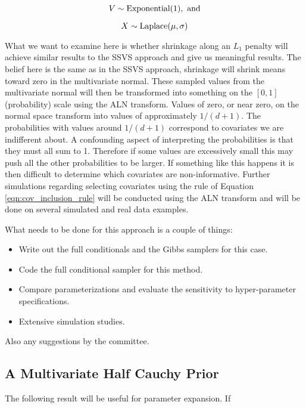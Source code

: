 \begin{equation}\newnot{symbol:exponential_dist}
V \sim \text{Exponential}(1), \text{ and}
\end{equation}

\begin{equation}\newnot{symbol:laplace_dist}
X \sim \text{Laplace}(\mu, \sigma)
\end{equation}

What we want to examine here is whether shrinkage along an $L_1$ penalty will achieve similar results to the SSVS approach and give us meaningful results. The belief here is the same as in the SSVS approach, shrinkage will shrink means toward zero in the multivariate normal. These sampled values from the multivariate normal will then be transformed into something on the $[0,1]$ (probability) scale using the ALN transform. Values of zero, or near zero, on the normal space transform into values of approximately $1/(d+1)$. The probabilities with values around $1/(d+1)$ correspond to covariates we are indifferent about. A confounding aspect of interpreting the probabilities is that they must all sum to 1. Therefore if some values are excessively small this may push all the other probabilities to be larger. If something like this happens it is then difficult to determine which covariates are non-informative. Further simulations regarding selecting covariates using the rule of Equation \ref{eqn:cov_inclusion_rule} will be conducted using the ALN transform and will be done on several simulated and real data examples.    

What needs to be done for this approach is a couple of things: 

\begin{itemize}
\item Write out the full conditionals and the Gibbs samplers for this case. 
\item Code the full conditional sampler for this method. 
\item Compare parameterizations and evaluate the sensitivity to hyper-parameter specifications. 
\item Extensive simulation studies. 
\end{itemize}
Also any suggestions by the committee.
\subsection{A Multivariate Half Cauchy Prior}

The following result will be useful for parameter expansion. If 

